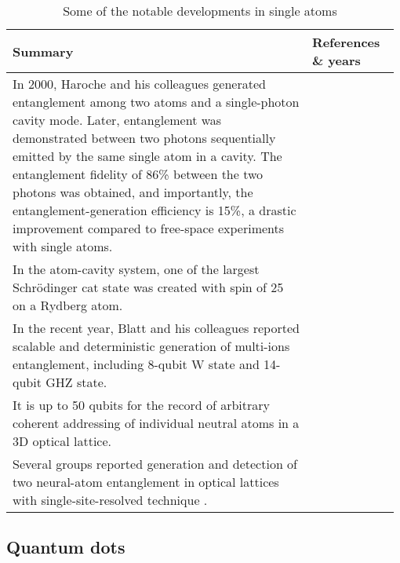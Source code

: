 \begin{table*}[!htbp]
	\begin{tabular}{|p{0.755\linewidth}|p{0.22\linewidth}|}
		\hline
		Summary & References \& years \\
		\hline \hline		
		In 2000, Haroche and his colleagues generated entanglement among two atoms and a single-photon cavity mode. Later, entanglement was demonstrated between two photons sequentially emitted by the same single atom in a cavity. The entanglement fidelity of 86\% between the two photons was obtained, and importantly, the entanglement-generation efficiency is 15\%, a drastic improvement compared to free-space experiments with single atoms. & \cite{bib:rauschenbeutel2000step, bib:wilk2007single, bib:blinov2004observation} \\
		\hline
		In the atom-cavity system, one of the largest Schr{\"o}dinger cat state was created with spin of 25 on a Rydberg atom. & \cite{bib:facon2016sensitive} \\
		\hline
		In the recent year, Blatt and his colleagues reported scalable and deterministic generation of multi-ions entanglement, including 8-qubit W state and 14-qubit GHZ state. & \cite{bib:haffner2005scalable, bib:monz2011}\\
		\hline
		It is up to 50 qubits for the record of arbitrary coherent addressing of individual neutral atoms in a 3D optical lattice. & \cite{bib:wang2015coherent} \\
		\hline		
		Several groups reported generation and detection of two neural-atom entanglement in optical lattices with single-site-resolved technique . & \cite{bib:kaufman2015entangling, bib:islam2015measuring, bib:dai2016generation}\\
		\hline
	\end{tabular}
	\captionspacetab \caption{Some of the notable developments in single atoms} \label{tab:single_atoms}
\end{table*}

%
%

\subsection{Quantum dots} 

